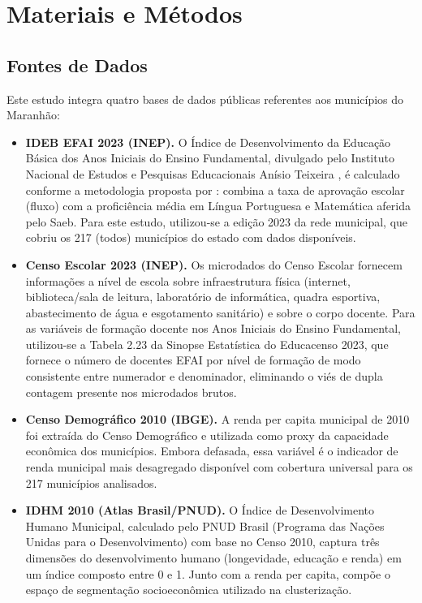 \chapter{Materiais e Métodos}
\label{cap:methods}

\section{Fontes de Dados}

Este estudo integra quatro bases de dados públicas referentes aos municípios do Maranhão:

\begin{itemize}
    \item \textbf{IDEB EFAI 2023 (INEP).} O Índice de Desenvolvimento da Educação Básica dos Anos Iniciais do Ensino Fundamental, divulgado pelo Instituto Nacional de Estudos e Pesquisas Educacionais Anísio Teixeira \cite{inep2023}, é calculado conforme a metodologia proposta por \citet{fernandes2007}: combina a taxa de aprovação escolar (fluxo) com a proficiência média em Língua Portuguesa e Matemática aferida pelo Saeb. Para este estudo, utilizou-se a edição 2023 da rede municipal, que cobriu os 217 (todos) municípios do estado com dados disponíveis.

    \item \textbf{Censo Escolar 2023 (INEP).} Os microdados do Censo Escolar fornecem informações a nível de escola sobre infraestrutura física (internet, biblioteca/sala de leitura, laboratório de informática, quadra esportiva, abastecimento de água e esgotamento sanitário) e sobre o corpo docente. Para as variáveis de formação docente nos Anos Iniciais do Ensino Fundamental, utilizou-se a Tabela 2.23 da Sinopse Estatística do Educacenso 2023, que fornece o número de docentes EFAI por nível de formação de modo consistente entre numerador e denominador, eliminando o viés de dupla contagem presente nos microdados brutos.

    \item \textbf{Censo Demográfico 2010 (IBGE).} A renda per capita municipal de 2010 foi extraída do Censo Demográfico \cite{ibge2010} e utilizada como proxy da capacidade econômica dos municípios. Embora defasada, essa variável é o indicador de renda municipal mais desagregado disponível com cobertura universal para os 217 municípios analisados.

    \item \textbf{IDHM 2010 (Atlas Brasil/PNUD).} O Índice de Desenvolvimento Humano Municipal, calculado pelo PNUD Brasil (Programa das Nações Unidas para o Desenvolvimento) com base no Censo 2010, captura três dimensões do desenvolvimento humano (longevidade, educação e renda) em um índice composto entre 0 e 1. Junto com a renda per capita, compõe o espaço de segmentação socioeconômica utilizado na clusterização.
\end{itemize}

